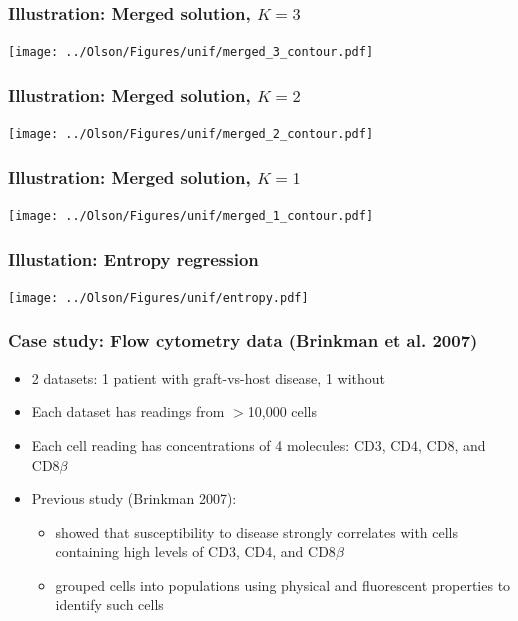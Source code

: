 \documentclass[mathserif,compress]{beamer}
\renewcommand\;{\,}
\begin{document}
\begin{frame}\frametitle{Illustration: Merged solution, $K = 3$}
\begin{center}
\texttt{[image: ../Olson/Figures/unif/merged\_3\_contour.pdf]}
\end{center}
\end{frame}

\begin{frame}\frametitle{Illustration: Merged solution, $K = 2$}
\begin{center}
\texttt{[image: ../Olson/Figures/unif/merged\_2\_contour.pdf]}
\end{center}
\end{frame}

\begin{frame}\frametitle{Illustration: Merged solution, $K = 1$}
\begin{center}
\texttt{[image: ../Olson/Figures/unif/merged\_1\_contour.pdf]}
\end{center}
\end{frame}


\begin{frame}\frametitle{Illustation: Entropy regression}
\begin{center}
\texttt{[image: ../Olson/Figures/unif/entropy.pdf]}
\end{center}

\end{frame}

\begin{frame}\frametitle{Case study: Flow cytometry data (Brinkman et al. 2007)}
\begin{itemize}
\item[]
2 datasets: 1 patient with graft-vs-host disease, 1 without
\bigskip
\item[]
Each dataset has readings from $>$10,000 cells
\bigskip
\item[]
Each cell reading has concentrations of 4 molecules: CD3, CD4, CD8, and CD8$\beta$
\bigskip
\item[]
Previous study (Brinkman 2007): 
\bigskip
\begin{itemize}
\item
showed that susceptibility to disease strongly correlates with cells containing high levels of CD3, CD4, and CD8$\beta$

\bigskip
\item
grouped cells into populations using physical and fluorescent properties to identify such cells
\end{itemize}
\end{itemize}
\end{frame}
\end{document}
